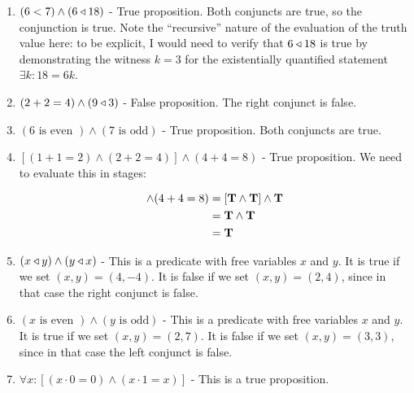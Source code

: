 \begin{solutions}
	
	\begin{enumerate}
		\item $(6 < 7 ) \wedge (6 \triangleleft 18)$ - True proposition. Both conjuncts are true, so the conjunction is true.  Note the ``recursive'' nature of the evaluation of the truth value here:  to be explicit, I would need to verify that $6\triangleleft 18$ is true by demonstrating the witness $k= 3$ for the existentially quantified statement $\exists k : 18 = 6k$.
		\item $(2+2=4) \wedge (9\triangleleft3)$ - False proposition.  The right conjunct is false.
		\item $(6 \textrm{ is even }) \wedge (7 \textrm{ is odd})$ - True proposition.  Both conjuncts are true.
		\item $[(1+1=2) \wedge (2+2 = 4)] \wedge (4+4 =8)$ - True proposition.  We need to evaluate this in stages:
		
		\begin{align*}
		[(1+1=2) \wedge (2+2 = 4)] \wedge (4+4 =8) &= [\T \wedge \T] \wedge \T\\
		&= \T \wedge \T\\
		& = \T
		\end{align*}
		
		\item $(x\triangleleft y) \wedge (y \triangleleft x)$ - This is a predicate with free variables $x$ and $y$.  It is true if we set $(x,y) = (4,-4)$.  It is false if we set $(x,y) = (2,4)$, since in that case the right conjunct is false.
		\item $(x \textrm{ is even }) \wedge (y \textrm{ is odd})$   - This is a predicate with free variables $x$ and $y$. It is true if we set $(x,y) = (2,7)$.  It is false if we set $(x,y) = (3,3)$, since in that case the left conjunct is false.
		\item $\forall x: [(x \cdot 0 = 0) \wedge (x \cdot 1 = x)]$ - This is a true proposition. 
		

\end{enumerate}
\end{solutions}
